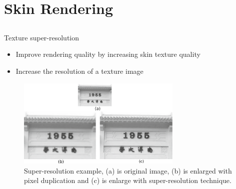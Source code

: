 \documentclass{beamer}
\begin{document}
\section{Skin Rendering}
\subsection{ }


\begin{frame}{Texture super-resolution}

\begin{itemize}
\setlength\itemsep{0.5em}
\item Improve rendering quality by increasing skin texture quality
\item Increase the resolution of a texture image
\end{itemize}

\begin{figure}
        \centering
        \includegraphics[width=0.7\textwidth]{img/super-resolution-int}
        \caption{Super-resolution example, (a) is original image, (b) is enlarged with pixel duplication and (c) is enlarge with super-resolution technique.}
\end{figure}
\end{frame}

\end{document}
